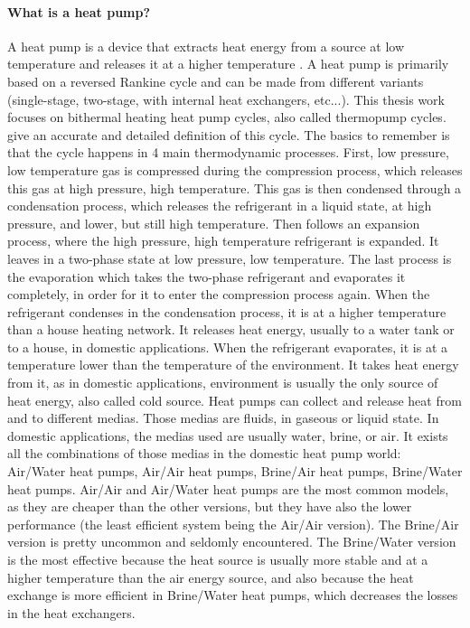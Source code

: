 \paragraph{What is a heat pump?}
A heat pump is a device that extracts heat
energy from a source at low
temperature and releases it at a higher temperature
\citep[based on def. p.\,607--608]{Borel-Favrat-2010a}. A heat pump is
primarily based on a reversed Rankine cycle and can be made from
different variants (single-stage, two-stage, with internal heat
exchangers, etc...). This thesis work focuses on bithermal heating
heat pump cycles, also called thermopump
cycles. \citet[p.\,639--643]{Borel-Favrat-2010a} give an accurate and
detailed definition of this cycle. The basics to remember is that the
cycle happens in 4 main thermodynamic processes. First, low pressure,
low temperature gas is compressed during the compression
process, which releases this gas at high
pressure, high temperature. This gas is then condensed through a
condensation process, which releases the refrigerant in a liquid
state, at high pressure, and lower, but still high temperature. Then
follows an expansion process, where the
high pressure, high temperature refrigerant is expanded. It leaves in
a two-phase state at low pressure, low temperature. The last process
is the evaporation which takes the two-phase refrigerant and
evaporates it completely, in order for it to enter the compression
process again. When the refrigerant condenses in the condensation
process, it is at a higher temperature than a house heating
network. It releases heat energy, usually to a
water tank or to a house, in domestic applications. When the
refrigerant evaporates, it is at a temperature lower than the
temperature of the environment. It takes heat energy from it, as in
domestic applications, environment is usually the only source of heat
energy, also called cold source. Heat pumps can collect and release heat from and to
different medias. Those medias are fluids, in gaseous or liquid
state. In domestic applications, the medias used are usually water,
brine,
or air. It exists all the combinations of those medias in the domestic
heat pump world: Air/Water heat pumps,
Air/Air heat pumps, Brine/Air heat pumps, Brine/Water heat
pumps. Air/Air and Air/Water heat pumps are the most common models, as
they are cheaper than the other versions, but they have also the lower
performance (the least efficient system being the Air/Air
version). The Brine/Air version is pretty uncommon and seldomly
encountered. The Brine/Water version is the most effective because the
heat source is usually more stable and at a higher temperature than
the air energy source, and also because the heat exchange is more
efficient in Brine/Water heat pumps, which decreases the losses in the
heat exchangers.

